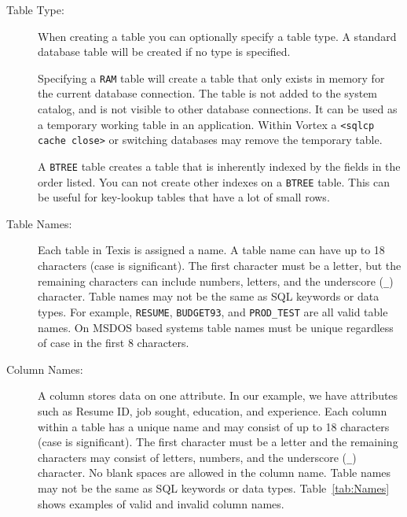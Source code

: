 \begin{description}

\item[Table Type:] When creating a table you can optionally specify a
table type.  A standard database table will be created if no type is
specified.

Specifying a \verb`RAM` table will create a table that only exists in
memory for the current database connection.  The table is not added
to the system catalog, and is not visible to other database connections.
It can be used as a temporary working table in an application.  Within
Vortex a \verb`<sqlcp cache close>` or switching databases may remove
the temporary table.

A \verb`BTREE` table creates a table that is inherently indexed by
the fields in the order listed.  You can not create other indexes on
a \verb`BTREE` table.  This can be useful for key-lookup tables that
have a lot of small rows.

\item[Table Names:] Each table in Texis is assigned a name.  A table
name can have up to 18 characters (case is significant).  The first
character must be a letter, but the remaining characters can include
numbers, letters, and the underscore (\verb`_`) character.  Table names
may not be the same as SQL keywords or data types.  For example,
\verb`RESUME`, \verb`BUDGET93`, and \verb`PROD_TEST` are all valid table
names.  On MSDOS based systems table names must be unique regardless of
case in the first 8 characters.

\item[Column Names:] A column stores data on one attribute.  In our
example, we have attributes such as Resume ID, job sought, education,
and experience.  Each column within a table has a unique name and may
consist of up to 18 characters (case is significant).  The first
character must be a letter and the remaining characters may consist of
letters, numbers, and the underscore (\verb`_`) character.  No blank
spaces are allowed in the column name.  Table names may not be the same
as SQL keywords or data types.  Table~\ref{tab:Names} shows examples of
valid and invalid column names.


\end{description}

